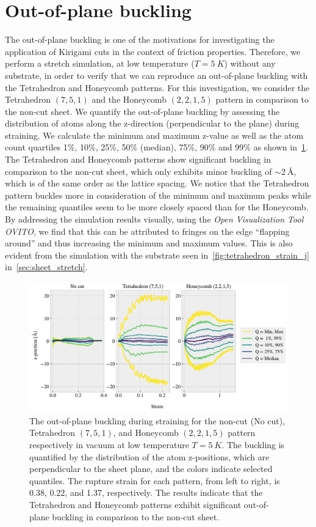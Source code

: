 \section{Out-of-plane buckling}\label{sec:out-of-plane_buckling}
The out-of-plane buckling is one of the motivations for investigating the
application of Kirigami cuts in the context of friction properties. Therefore,
we perform a stretch simulation, at low temperature ($T = \SI{5}{K}$) without
any substrate, in order to verify that we can reproduce an out-of-plane buckling
with the Tetrahedron and Honeycomb patterns. For this investigation, we consider
the Tetrahedron $(7,5,1)$ and the Honeycomb $(2,2,1,5)$ pattern in comparison to
the non-cut sheet. We quantify the out-of-plane buckling by assessing the
distribution of atoms along the z-direction (perpendicular to the plane) during
straining. We calculate the minimum and maximum z-value as well as the atom
count quartiles 1\%, 10\%, 25\%, 50\% (median), 75\%, 90\% and 99\% as shown
in~\cref{fig:buckling_quartiles}. The Tetrahedron and Honeycomb patterns show
significant buckling in comparison to the non-cut sheet, which only exhibits
minor buckling of $\sim \SI{2}{\text{Å}}$, which is of the same order as the
lattice spacing. We notice that the Tetrahedron pattern buckles more in
consideration of the minimum and maximum peaks while the remaining quantiles
seem to be more closely spaced than for the Honeycomb. By addressing the
simulation results visually, using the \textit{Open Visualization Tool OVITO},
we find that this can be attributed to fringes on the edge ``flapping around''
and thus increasing the minimum and maximum values. This is also evident from
the simulation with the substrate seen in~\cref{fig:tetrahedron_strain_j}
in~\cref{sec:sheet_stretch}.

\begin{figure}[!htb]
  \centering
  \includegraphics[width=\linewidth]{figures/baseline/vacuum_normal_buckling.pdf}
  \caption{The out-of-plane buckling during straining for the non-cut (No cut), Tetrahedron $(7,5,1)$, and Honeycomb $(2,2,1,5)$ pattern respectively in vacuum at low temperature $T = \SI{5}{K}$. The buckling is quantified by the distribution of the atom z-positions, which are perpendicular to the sheet plane, and the colors indicate selected quantiles. The rupture strain for each pattern, from left to right, is 0.38, 0.22, and 1.37, respectively. The results indicate that the Tetrahedron and Honeycomb patterns exhibit significant out-of-plane buckling in comparison to the non-cut sheet.}
  \label{fig:buckling_quartiles}
\end{figure}

